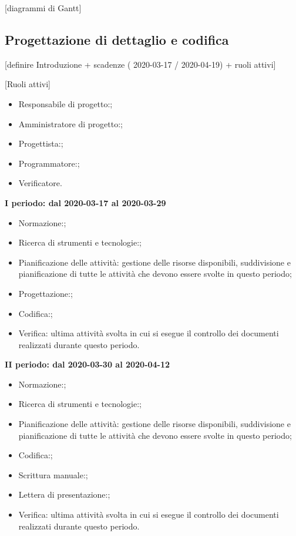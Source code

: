 [diagrammi di Gantt]

\subsection{Progettazione di dettaglio e codifica}
[definire Introduzione + scadenze ( 2020-03-17 / 2020-04-19) + ruoli attivi]

[Ruoli attivi]
\begin{itemize}
	\item Responsabile di progetto:;
	\item Amministratore di progetto:;
	\item Progettista:;
	\item Programmatore:;
	\item Verificatore.
\end{itemize}

\textbf{I periodo: dal 2020-03-17 al 2020-03-29}
\begin{itemize}
	\item Normazione:;
	\item Ricerca di strumenti e tecnologie:;
	\item Pianificazione delle attività: gestione delle risorse disponibili, suddivisione e pianificazione di tutte le attività che devono essere svolte in questo periodo;
	\item Progettazione:;
	\item Codifica:;
	\item Verifica: ultima attività svolta in cui si esegue il controllo dei documenti realizzati durante questo periodo.
\end{itemize}

\textbf{II periodo: dal 2020-03-30 al 2020-04-12}
\begin{itemize}
	\item Normazione:;
	\item Ricerca di strumenti e tecnologie:;
	\item Pianificazione delle attività: gestione delle risorse disponibili, suddivisione e pianificazione di tutte le attività che devono essere svolte in questo periodo;
	\item Codifica:;
	\item Scrittura manuale:;
	\item Lettera di presentazione:;
	\item Verifica: ultima attività svolta in cui si esegue il controllo dei documenti realizzati durante questo periodo.
\end{itemize}


